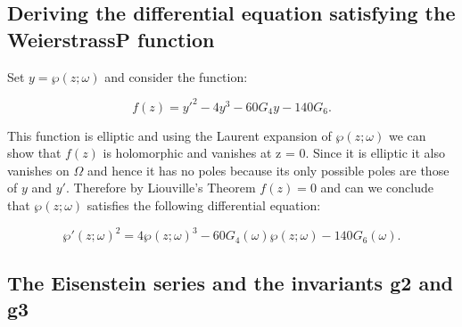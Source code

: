 \subsection{Deriving the differential equation satisfying the WeierstrassP function}

Set $y=\wp(z; \omega)$ and consider the function:

\[
    f(z) = y'^{2} - 4y^3 - 60G_4 y - 140G_6.
\]

\noindent
This function is elliptic and using the Laurent expansion of $\wp(z;\omega)$ we can show that $f(z)$ is holomorphic
and vanishes at z = 0. Since it is elliptic it also vanishes on $\Omega$ and hence it has no poles because its only
possible poles are those of $y$ and $y'$. Therefore by Liouville's Theorem $f(z)=0$ and can we conclude that
$\wp(z; \omega)$ satisfies the following differential equation:

\[
    \wp'(z; \omega)^2 = 4 \wp(z; \omega)^3 - 60G_4(\omega)\wp(z; \omega) - 140G_6(\omega).
\]


\subsection{The Eisenstein series and the invariants g2 and g3}